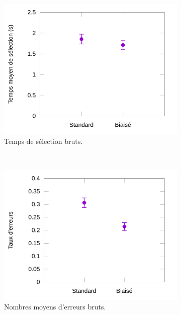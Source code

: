 	\begin{figure}[!htb]
		\begin{subfigure}[t]{0.49\textwidth}
			\centering
			\includegraphics[width=\textwidth]{figures/ch5/hookRawTimes}
			\caption{Temps de sélection bruts.}
			\label{fig:hookRawTimes}
		\end{subfigure}
		~
		\begin{subfigure}[t]{0.49\textwidth}
			\centering
			\includegraphics[width=\textwidth]{figures/ch5/hookRawErrors}
			\caption{Nombres moyens d'erreurs bruts.}
			\label{fig:hookRawErrors}
		\end{subfigure}
		~
		\begin{subfigure}[t]{0.49\textwidth}
			\centering

\end{subfigure}
\end{figure}
